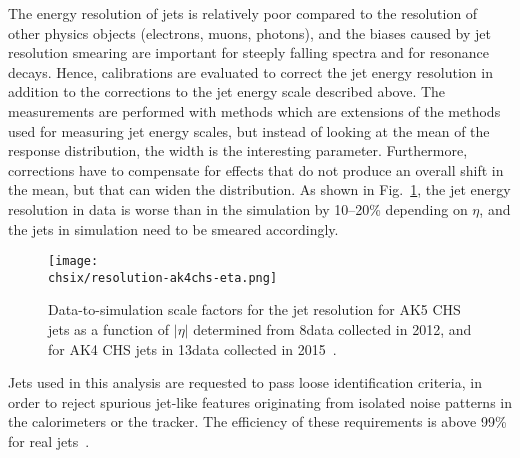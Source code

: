The energy resolution of jets is relatively poor compared to the resolution of other physics objects (electrons, muons, photons), and the biases caused by jet resolution smearing are important for steeply falling spectra and for resonance decays. Hence, calibrations are evaluated to correct the jet energy resolution in addition to the corrections to the jet energy scale described above. The measurements are performed with methods which are extensions of the methods used for measuring jet energy scales, but instead of looking at the mean of the response distribution, the width is the interesting parameter. Furthermore, corrections have to compensate for effects that do not produce an overall shift in the mean, but that can widen the distribution. As shown in Fig.~\ref{fig:resolcorr813TeV}, the jet energy resolution in data is worse than in the simulation by 10--20\% depending on $\eta$, and the jets in simulation need to be smeared accordingly.\\

\begin{figure}[!htb]
\begin{center}
\texttt{[image: \\chsix/resolution-ak4chs-eta.png]}
\end{center} 
\caption{Data-to-simulation scale factors for the jet \pt resolution for AK5 CHS jets as a function of $|\eta|$ determined from 8\TeV data collected in 2012, and for AK4 CHS jets in 13\TeV data collected in 2015~\cite{CMS-DP-2016-020}.}
\label{fig:resolcorr813TeV}
\end{figure}

Jets used in this analysis are requested to pass loose identification criteria, in order to reject spurious jet-like features originating from isolated noise patterns in the calorimeters or the tracker. The efficiency of these requirements is above 99\% for real jets~\cite{CMS-PAS-JME-10-003}. 

